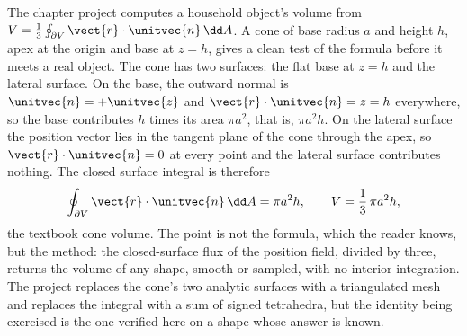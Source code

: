 \begin{example}
The chapter project computes a household object's volume from
$V = \tfrac{1}{3}\oint_{\partial V}\vect{r}\cdot\unitvec{n}\,\dd A$.
A cone of base radius $a$ and height $h$, apex at the origin and base
at $z = h$, gives a clean test of the formula before it meets a real
object. The cone has two surfaces: the flat base at $z = h$ and the
lateral surface. On the base, the outward normal is $\unitvec{n} =
+\unitvec{z}$ and $\vect{r}\cdot\unitvec{n} = z = h$ everywhere, so the
base contributes $h$ times its area $\pi a^{2}$, that is, $\pi a^{2}h$.
On the lateral surface the position vector lies in the tangent plane
of the cone through the apex, so $\vect{r}\cdot\unitvec{n} = 0$ at
every point and the lateral surface contributes nothing. The closed
surface integral is therefore
\[
\oint_{\partial V}\vect{r}\cdot\unitvec{n}\,\dd A = \pi a^{2}h,
\qquad V = \frac{1}{3}\,\pi a^{2}h,
\]
the textbook cone volume. The point is not the formula, which the reader knows, but
the method: the closed-surface flux of the position field, divided by
three, returns the volume of any shape, smooth or sampled, with no
interior integration. The project replaces the cone's two analytic
surfaces with a triangulated mesh and replaces the integral with a
sum of signed tetrahedra, but the identity being exercised is the one
verified here on a shape whose answer is known.
\end{example}

